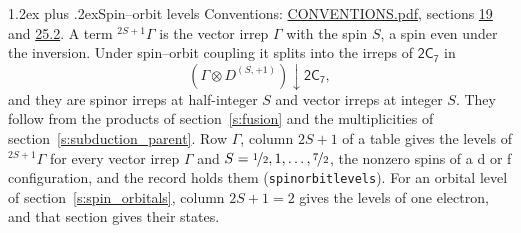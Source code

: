 \documentclass[10pt,a4paper]{article}
\makeatletter
\renewcommand\section{\@startsection{section}{1}{\z@}{-3ex plus -1ex minus -.2ex}%
  {1.2ex plus .2ex}{\normalfont\large\sffamily\bfseries\color{parttitle}}}
\numberwithin{equation}{section}
\newcommand{\grp}[1]{\mathsf{#1}}
\newcommand{\restr}[2]{#1\!\downarrow#2}
\newcommand{\irrJp}[2]{D^{(#1,#2)}}
\newcommand{\irrprod}{\otimes}
\newcommand{\term}[2]{{}^{#1}#2}
\makeatother
\begin{document}
\section{Spin--orbit levels}\label{s:spin_orbit}
Conventions: \href{../../CONVENTIONS.pdf}{CONVENTIONS.pdf}, sections \href{../../../rotation/CONVENTIONS.pdf\#conv.19}{19} and \href{../../CONVENTIONS.pdf\#conv.25.2}{25.2}.
\leavevmode\label{n:local.spin}\label{n:symbol.term}A term $\term{2S+1}{\Gamma}$ is the vector irrep $\Gamma$ with the spin $S$, a spin even under the inversion. Under spin--orbit coupling it splits into the irreps of $\grp{2C_{7}}$ in
\begin{equation}\label{e:spinorbit}\restr{(\Gamma \irrprod \irrJp{S}{+1})}{\grp{2C_{7}}},\end{equation}
and they are spinor irreps at half-integer $S$ and vector irreps at integer $S$. They follow from the products of section~\ref{s:fusion} and the multiplicities of section~\ref{s:subduction_parent}. Row $\Gamma$, column $2S + 1$ of a table gives the levels of $\term{2S+1}{\Gamma}$ for every vector irrep $\Gamma$ and $S = \nicefrac{1}{2}, 1, \dots, \nicefrac{7}{2}$, the nonzero spins of a d or f configuration, and the record holds them (\texttt{spinorbitlevels}). For an orbital level of section~\ref{s:spin_orbitals}, column $2S + 1 = 2$ gives the levels of one electron, and that section gives their states.
\end{document}
